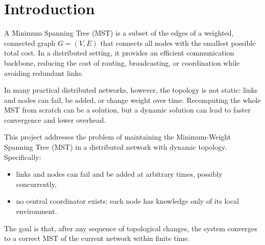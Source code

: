 \chapter{Introduction}\label{ch:intro}


A Minimum Spanning Tree (MST) is a subset of the edges of a weighted, connected graph $G = (V, E)$ that connects all nodes with the smallest possible total cost. In a distributed setting, it provides an efficient communication backbone, reducing the cost of routing, broadcasting, or coordination while avoiding redundant links.

In many practical distributed networks, however, the topology is not static: links and nodes can fail, be added, or change weight over time. Recomputing the whole MST from scratch can be a solution, but a dynamic solution can lead to faster convergence and lower overhead.

This project addresses the problem of maintaining the Minimum-Weight Spanning Tree (MST) in a distributed network with dynamic topology. Specifically:

\begin{itemize}
\item links and nodes can fail and be added at arbitrary times, possibly concurrently,
\item no central coordinator exists: each node has knowledge only of its local
environment.
\end{itemize}

The goal is that, after any sequence of topological changes, the system converges to a correct MST of the current network within finite time.

